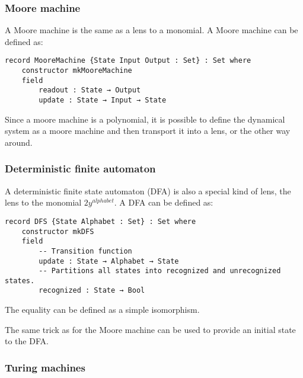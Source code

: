 \subsubsection{Moore machine}
A Moore machine is the same as a lens to a monomial. A Moore machine can be defined as:

\begin{verbatim}
record MooreMachine {State Input Output : Set} : Set where
    constructor mkMooreMachine
    field
        readout : State → Output
        update : State → Input → State
\end{verbatim}

Since a moore machine is a polynomial, it is possible to define the dynamical system as a moore machine and then transport it into a lens, or the other way around.

\subsubsection{Deterministic finite automaton}
A deterministic finite state automaton (DFA) is also a special kind of lens, the lens to the monomial $2y^{alphabet}$. A DFA can be defined as:
\begin{verbatim}
record DFS {State Alphabet : Set} : Set where
    constructor mkDFS
    field
        -- Transition function
        update : State → Alphabet → State
        -- Partitions all states into recognized and unrecognized states.
        recognized : State → Bool
\end{verbatim}

The equality can be defined as a simple isomorphism.

The same trick as for the Moore machine can be used to provide an initial state to the DFA.


\subsubsection{Turing machines}

